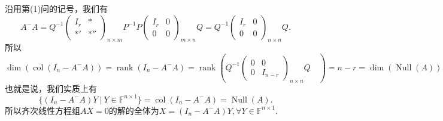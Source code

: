 沿用第(1)问的记号，我们有
$$A^-A = Q^{-1} \begin{pmatrix} I_r & * \\ *' & *'' \end{pmatrix}_{n\times m}\!\!\!\!\!\!\!\!\!\!\! P^{-1} P \begin{pmatrix} I_r & 0 \\ 0 & 0 \end{pmatrix}_{m\times n}\!\!\!\!\!\!\!\!\!\!\! Q = Q^{-1} \begin{pmatrix} I_r & 0 \\ 0 & 0 \end{pmatrix}_{n\times n}\!\!\!\!\!\!\!\!\!\! Q.$$
所以
$$\dim \left( \operatorname{col}(I_n - A^-A) \right) = \operatorname{rank} (I_n - A^-A) = \operatorname{rank} \left( Q^{-1} \begin{pmatrix} 0 & 0 \\ 0 & I_{n-r} \end{pmatrix}_{n\times n}\!\!\!\!\!\!\!\!\!\! Q \hspace{1em} \right) = n - r = \dim \left( \operatorname{Null} (A) \right).$$
也就是说，我们实质上有$$\{ (I_n - A^-A)Y ~|~ Y \in \mathbb{F}^{n\times 1} \} = \operatorname{col}(I_n - A^-A) = \operatorname{Null} (A).$$
所以齐次线性方程组$AX = 0$的解的全体为$X = (I_n - A^-A)Y, \forall Y \in \mathbb{F}^{n\times 1}.$

\vspace{1em}

